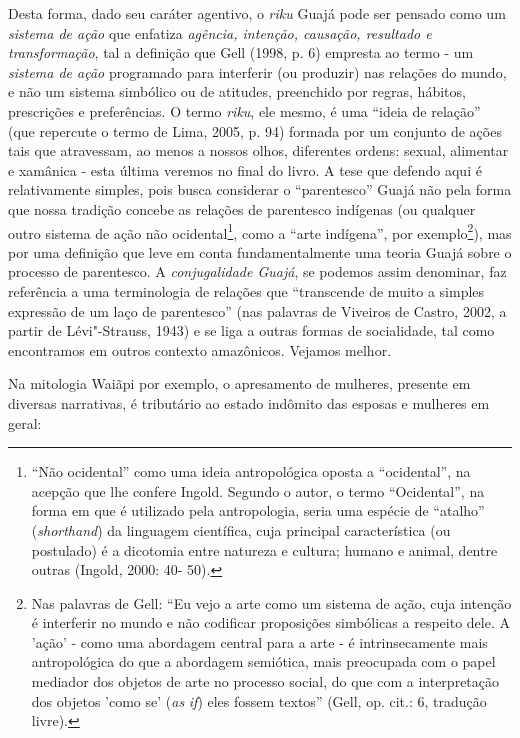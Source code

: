 Desta forma, dado seu caráter agentivo, o \emph{riku} Guajá pode ser
pensado como um \emph{sistema de ação} que enfatiza \emph{agência,
intenção, causação, resultado e transformação}, tal a definição que Gell
(1998, p. 6) empresta ao termo - um \emph{sistema de ação} programado
para interferir (ou produzir) nas relações do mundo, e não um sistema
simbólico ou de atitudes, preenchido por regras, hábitos, prescrições e
preferências. O termo \emph{riku}, ele mesmo, é uma ``ideia de relação''
(que repercute o termo de Lima, 2005, p. 94) formada por um conjunto de
ações tais que atravessam, ao menos a nossos olhos, diferentes ordens:
sexual, alimentar e xamânica - esta última veremos no final do livro. A
tese que defendo aqui é relativamente simples, pois busca considerar o
``parentesco'' Guajá não pela forma que nossa tradição concebe as relações
de parentesco indígenas (ou qualquer outro sistema de ação não
ocidental\footnote{``Não ocidental'' como uma ideia antropológica oposta a
  ``ocidental'', na acepção que lhe confere Ingold. Segundo o autor, o
  termo ``Ocidental'', na forma em que é utilizado pela antropologia,
  seria uma espécie de ``atalho'' (\emph{shorthand}) da linguagem
  científica, cuja principal característica (ou postulado) é a dicotomia
  entre natureza e cultura; humano e animal, dentre outras (Ingold,
  2000: 40- 50).}, como a ``arte indígena'', por exemplo\footnote{Nas
  palavras de Gell: ``Eu vejo a arte como um sistema de ação, cuja
      intenção é interferir no mundo e não codificar proposições simbólicas
      a respeito dele. A 'ação' - como uma abordagem central para a arte - é
      intrinsecamente mais antropológica do que a abordagem semiótica, mais
      preocupada com o papel mediador dos objetos de arte no processo
      social, do que com a interpretação dos objetos 'como se' (\emph{as}
      \emph{if}) eles fossem textos'' (Gell, op. cit.: 6, tradução livre).}),
mas por uma definição que leve em conta fundamentalmente uma teoria
Guajá sobre o processo de parentesco. A \emph{conjugalidade Guajá}, se
podemos assim denominar, faz referência a uma terminologia de relações
que ``transcende de muito a simples expressão de um laço de parentesco''
(nas palavras de Viveiros de Castro, 2002, a partir de Lévi"-Strauss,
1943) e se liga a outras formas de socialidade, tal como encontramos em
outros contexto amazônicos. Vejamos melhor.

Na mitologia Waiãpi por exemplo, o apresamento de mulheres, presente em
diversas narrativas, é tributário ao estado indômito das esposas e
mulheres em geral:

